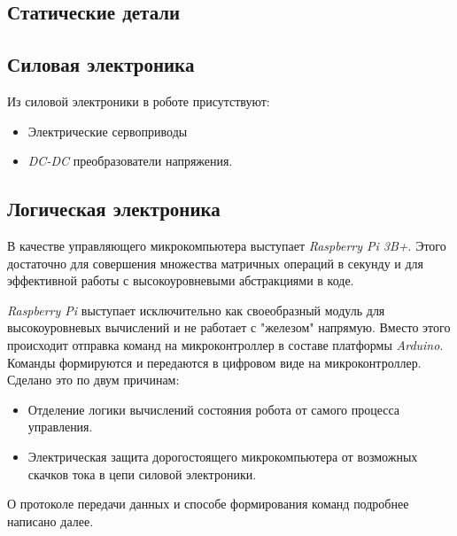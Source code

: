 \subsection{Статические детали}

\subsection{Силовая электроника}
Из силовой электроники в роботе присутствуют:
\begin{itemize}
    \item Электрические сервоприводы
    \item \textit{DC-DC} преобразователи напряжения.
\end{itemize}

\subsection{Логическая электроника}
В качестве управляющего микрокомпьютера выступает \textit{Raspberry Pi 3B+}. Этого достаточно для совершения множества матричных операций в секунду и для эффективной работы с высокоуровневыми абстракциями в коде.

\textit{Raspberry Pi} выступает исключительно как своеобразный модуль для высокоуровневых вычислений и не работает с "железом" напрямую. Вместо этого происходит отправка команд на микроконтроллер в составе платформы \textit{Arduino}. Команды формируются и передаются в цифровом виде на микроконтроллер. Сделано это по двум причинам:
\begin{itemize}
    \item Отделение логики вычислений состояния робота от самого процесса управления.
    \item Электрическая защита дорогостоящего микрокомпьютера от возможных скачков тока в цепи силовой электроники.
\end{itemize}

О протоколе передачи данных и способе формирования команд подробнее написано далее. \fixme